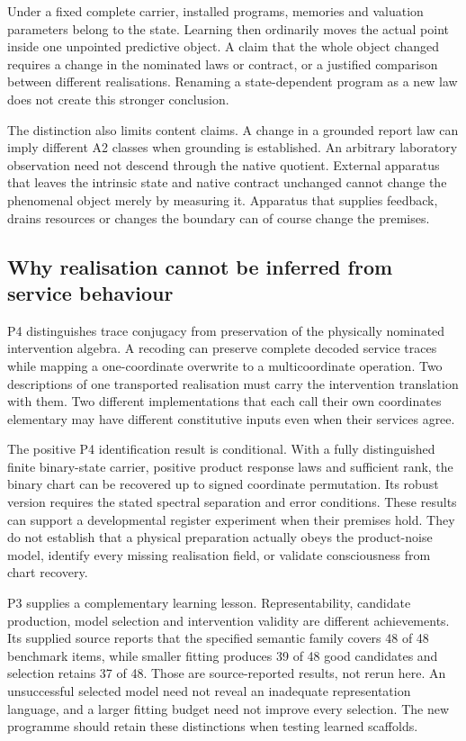 \documentclass[
  11pt,
  a4paper,
]{article}
\begin{document}
Under a fixed complete carrier, installed programs, memories and
valuation parameters belong to the state. Learning then ordinarily moves
the actual point inside one unpointed predictive object. A claim that
the whole object changed requires a change in the nominated laws or
contract, or a justified comparison between different realisations.
Renaming a state-dependent program as a new law does not create this
stronger conclusion.

The distinction also limits content claims. A change in a grounded
report law can imply different A2 classes when grounding is established.
An arbitrary laboratory observation need not descend through the native
quotient. External apparatus that leaves the intrinsic state and native
contract unchanged cannot change the phenomenal object merely by
measuring it. Apparatus that supplies feedback, drains resources or
changes the boundary can of course change the premises.

\subsection{Why realisation cannot be inferred from service
behaviour}\label{why-realization-cannot-be-inferred-from-service-behavior}

P4 distinguishes trace conjugacy from preservation of the physically
nominated intervention algebra. A recoding can preserve complete decoded
service traces while mapping a one-coordinate overwrite to a
multicoordinate operation. Two descriptions of one transported
realisation must carry the intervention translation with them. Two
different implementations that each call their own coordinates
elementary may have different constitutive inputs even when their
services agree.

The positive P4 identification result is conditional. With a fully
distinguished finite binary-state carrier, positive product response
laws and sufficient rank, the binary chart can be recovered up to signed
coordinate permutation. Its robust version requires the stated spectral
separation and error conditions. These results can support a
developmental register experiment when their premises hold. They do not
establish that a physical preparation actually obeys the product-noise
model, identify every missing realisation field, or validate
consciousness from chart recovery.

P3 supplies a complementary learning lesson. Representability, candidate
production, model selection and intervention validity are different
achievements. Its supplied source reports that the specified semantic
family covers 48 of 48 benchmark items, while smaller fitting produces
39 of 48 good candidates and selection retains 37 of 48. Those are
source-reported results, not rerun here. An unsuccessful selected model
need not reveal an inadequate representation language, and a larger
fitting budget need not improve every selection. The new programme
should retain these distinctions when testing learned scaffolds.
\end{document}
